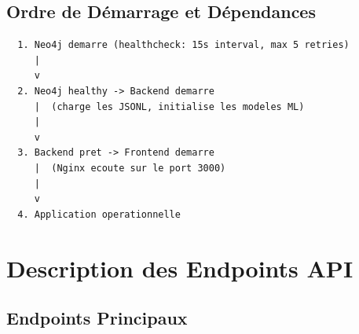 \documentclass[12pt,a4paper]{article}
\begin{document}
\subsection{Ordre de Démarrage et Dépendances}

\begin{verbatim}
  1. Neo4j demarre (healthcheck: 15s interval, max 5 retries)
     |
     v
  2. Neo4j healthy -> Backend demarre
     |  (charge les JSONL, initialise les modeles ML)
     |
     v
  3. Backend pret -> Frontend demarre
     |  (Nginx ecoute sur le port 3000)
     |
     v
  4. Application operationnelle
\end{verbatim}

\section{Description des Endpoints API}

\subsection{Endpoints Principaux}
\end{document}
